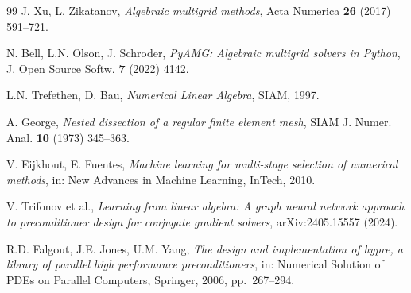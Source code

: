 \documentclass[11pt]{article}
\begin{document}
\begin{thebibliography}{99}
 J. Xu, L. Zikatanov, \emph{Algebraic multigrid methods},
Acta Numerica \textbf{26} (2017) 591--721.

 N. Bell, L.N. Olson, J. Schroder, \emph{PyAMG: Algebraic
multigrid solvers in Python}, J. Open Source Softw. \textbf{7} (2022) 4142.

 L.N. Trefethen, D. Bau, \emph{Numerical Linear
Algebra}, SIAM, 1997.

 A. George, \emph{Nested dissection of a regular finite
element mesh}, SIAM J. Numer. Anal. \textbf{10} (1973) 345--363.

 V. Eijkhout, E. Fuentes, \emph{Machine learning for
multi-stage selection of numerical methods}, in: New Advances in Machine
Learning, InTech, 2010.

 V. Trifonov et al., \emph{Learning from linear algebra:
A graph neural network approach to preconditioner design for conjugate gradient
solvers}, arXiv:2405.15557 (2024).

 R.D. Falgout, J.E. Jones, U.M. Yang, \emph{The design and
implementation of hypre, a library of parallel high performance
preconditioners}, in: Numerical Solution of PDEs on Parallel Computers,
Springer, 2006, pp.~267--294.

\end{thebibliography}
\end{document}
